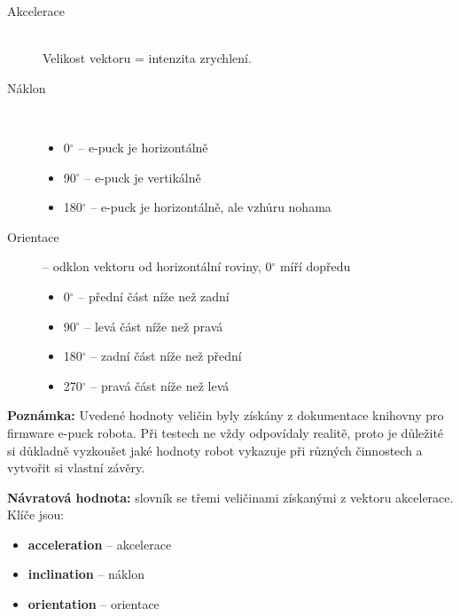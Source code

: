 \documentclass[12pt,notitlepage]{report}
\newenvironment{popis}%
{\begin{list}{}%
         {\setlength{\leftmargin}{0.5cm}\setlength{\topsep}{1pt}
          \setlength{\itemsep}{0.1cm} \setlength{\parsep}{0.2cm}}%
         \item[]%
}
{\end{list}}
\begin{document}
\begin{popis}
\begin{popis}
        \begin{description}
            \item[Akcelerace] \hfill\\ Velikost vektoru = intenzita zrychlení.
            \item[Náklon] \hfill \\ \vspace{-5mm}
                \begin{itemize}
                    \item 0$^{\circ}$ -- e-puck je horizontálně
                    \item 90$^{\circ}$ -- e-puck je vertikálně
                    \item 180$^{\circ}$ -- e-puck je horizontálně, ale vzhůru
                    nohama
                \end{itemize}
            \item[Orientace] -- odklon vektoru od horizontální roviny,
            0$^{\circ}$ míří dopředu \\ \vspace{-5mm}
            \begin{itemize}
                \item 0$^{\circ}$ -- přední část níže než zadní
                \item 90$^{\circ}$ -- levá část níže než pravá
                \item 180$^{\circ}$ -- zadní část níže než přední
                \item 270$^{\circ}$ -- pravá část níže než levá
            \end{itemize}
        \end{description}

        {\bf Poznámka:} Uvedené hodnoty veličin byly získány z dokumentace
        knihovny pro firmware e-puck robota. Při testech ne vždy odpovídaly
        realitě, proto je důležité si důkladně vyzkoušet jaké hodnoty robot
        vykazuje při různých činnostech a vytvořit si vlastní závěry.

        {\bf Návratová hodnota:} slovník se třemi veličinami získanými z
        vektoru akcelerace. Klíče jsou:
        \begin{itemize}
            \item {\bf acceleration} -- akcelerace
            \item {\bf inclination} -- náklon
            \item {\bf orientation} -- orientace
        \end{itemize}
        \end{popis}


\end{popis}
\end{document}
